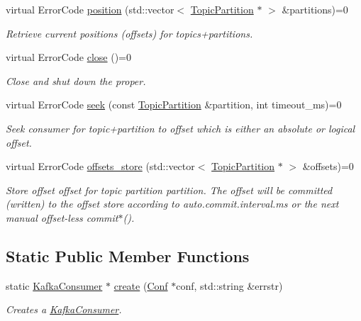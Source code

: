 \begin{DoxyCompactItemize}
virtual ErrorCode \hyperlink{classRdKafka_1_1KafkaConsumer_a49705c19baac7e00f6558fb7b4410a57}{position} (std::vector$<$ \hyperlink{classRdKafka_1_1TopicPartition}{TopicPartition} $\ast$ $>$ \&partitions)=0
\begin{DoxyCompactList}\small\item\em Retrieve current positions (offsets) for topics+partitions. \item\end{DoxyCompactList}\item 
virtual ErrorCode \hyperlink{classRdKafka_1_1KafkaConsumer_a5c78a721aa91f3be9903f09ddf084644}{close} ()=0
\begin{DoxyCompactList}\small\item\em Close and shut down the proper. \item\end{DoxyCompactList}\item 
virtual ErrorCode \hyperlink{classRdKafka_1_1KafkaConsumer_ab08a9a8175edd12ae4e1d5bb0eb50479}{seek} (const \hyperlink{classRdKafka_1_1TopicPartition}{TopicPartition} \&partition, int timeout\_\-ms)=0
\begin{DoxyCompactList}\small\item\em Seek consumer for topic+partition to offset which is either an absolute or logical offset. \item\end{DoxyCompactList}\item 
virtual ErrorCode \hyperlink{classRdKafka_1_1KafkaConsumer_ab693da27c7664692d2247398d483e931}{offsets\_\-store} (std::vector$<$ \hyperlink{classRdKafka_1_1TopicPartition}{TopicPartition} $\ast$ $>$ \&offsets)=0
\begin{DoxyCompactList}\small\item\em Store offset {\ttfamily offset} for topic partition {\ttfamily partition}. The offset will be committed (written) to the offset store according to {\ttfamily auto.commit.interval.ms} or the next manual offset-\/less commit$\ast$(). \item\end{DoxyCompactList}\end{DoxyCompactItemize}
\subsection*{Static Public Member Functions}
\begin{DoxyCompactItemize}
\item 
static \hyperlink{classRdKafka_1_1KafkaConsumer}{KafkaConsumer} $\ast$ \hyperlink{classRdKafka_1_1KafkaConsumer_ac32a5eb3474b3315635cb1d39794d068}{create} (\hyperlink{classRdKafka_1_1Conf}{Conf} $\ast$conf, std::string \&errstr)
\begin{DoxyCompactList}\small\item\em Creates a \hyperlink{classRdKafka_1_1KafkaConsumer}{KafkaConsumer}. \item\end{DoxyCompactList}\end{DoxyCompactItemize}



